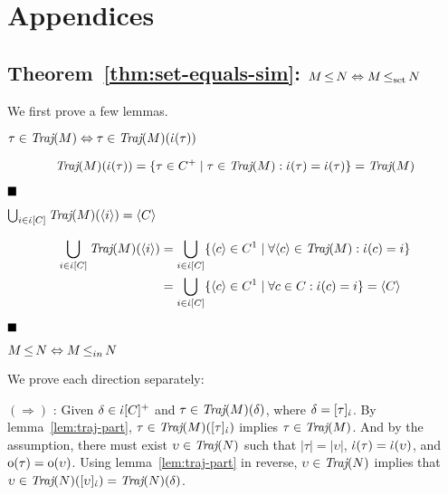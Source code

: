\section{Appendices}

\subsection{Theorem~\ref{thm:set-equals-sim}: $M \operatorname{\leq} N \Leftrightarrow M \operatorname{\operatorname{\leq}_{\textrm{set}}} N$}

We first prove a few lemmas.

\begin{lemma} \label{lem:traj-part}
$\tau \in \operatorname{\textit{Traj}}(M) \Leftrightarrow \tau \in \operatorname{\textit{Traj}}(M)(\dot{\iota}(\tau))$
\end{lemma}

\begin{equation*}
\operatorname{\textit{Traj}}(M)(\dot{\iota}(\tau)) = \{ \tau \in C^{+} \mid \tau \in \operatorname{\textit{Traj}}(M) : \dot{\iota}(\tau) = \dot{\iota}(\tau) \} = \operatorname{\textit{Traj}}(M)
\end{equation*}

$\Qed$

\begin{lemma} \label{lem:traj-all}
$\bigcup_{i \in \dot{\iota}[C]} \operatorname{\textit{Traj}}(M)(\langle i \rangle) = \langle C \rangle$
\end{lemma}

\begin{align*}
\bigcup_{i \in \dot{\iota}[C]} \operatorname{\textit{Traj}}(M)(\langle i \rangle) & = \bigcup_{i \in \dot{\iota}[C]} \{ \langle c \rangle \in C^{1} \mid \forall \langle c \rangle \in \operatorname{\textit{Traj}}(M) : \dot{\iota}(c) = i \} \\ & = \bigcup_{i \in \dot{\iota}[C]} \{ \langle c \rangle \in C^{1} \mid \forall c \in C : \dot{\iota}(c) = i \} = \langle C \rangle
\end{align*}

$\Qed$

\begin{lemma} \label{lem:ref-iff-in}
$M \operatorname{\leq} N \Leftrightarrow M \operatorname{\leq}_{in} N$
\end{lemma}

We prove each direction separately:

$(\Rightarrow)$ : Given $\delta \in \dot{\iota}[C]^{+}$ and $\tau \in \operatorname{\textit{Traj}}(M)(\delta)$, where $\delta = [\tau]_{\dot{\iota}}$. By lemma~\ref{lem:traj-part}, $\tau \in \operatorname{\textit{Traj}}(M)([\tau]_{\dot{\iota}})$ implies $\tau \in \operatorname{\textit{Traj}}(M)$. And by the assumption, there must exist $\upsilon \in \operatorname{\textit{Traj}}(N)$ such that $| \tau | = | \upsilon |$, $\dot{\iota}(\tau) = \dot{\iota}(\upsilon)$, and $\mathrm{o}(\tau) = \mathrm{o}(\upsilon)$. Using lemma~\ref{lem:traj-part} in reverse, $\upsilon \in \operatorname{\textit{Traj}}(N)$ implies that $\upsilon \in \operatorname{\textit{Traj}}(N)([\upsilon]_{\dot{\iota}}) = \operatorname{\textit{Traj}}(N)(\delta)$.

